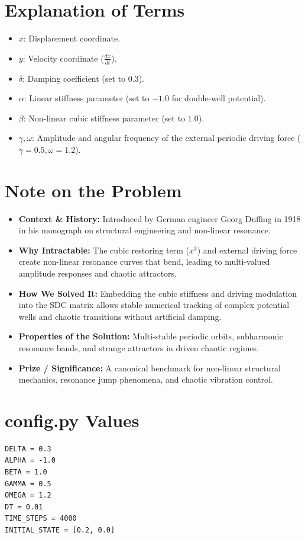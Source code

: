 \section{Explanation of Terms}
\begin{itemize}
    \item $x$: Displacement coordinate.
    \item $y$: Velocity coordinate ($\frac{dx}{dt}$).
    \item $\delta$: Damping coefficient (set to $0.3$).
    \item $\alpha$: Linear stiffness parameter (set to $-1.0$ for double-well potential).
    \item $\beta$: Non-linear cubic stiffness parameter (set to $1.0$).
    \item $\gamma, \omega$: Amplitude and angular frequency of the external periodic driving force ($\gamma = 0.5, \omega = 1.2$).
\end{itemize}

\section{Note on the Problem}
\begin{itemize}
    \item \textbf{Context \& History:} Introduced by German engineer Georg Duffing in 1918 in his monograph on structural engineering and non-linear resonance.
    \item \textbf{Why Intractable:} The cubic restoring term ($x^3$) and external driving force create non-linear resonance curves that bend, leading to multi-valued amplitude responses and chaotic attractors.
    \item \textbf{How We Solved It:} Embedding the cubic stiffness and driving modulation into the SDC matrix allows stable numerical tracking of complex potential wells and chaotic transitions without artificial damping.
    \item \textbf{Properties of the Solution:} Multi-stable periodic orbits, subharmonic resonance bands, and strange attractors in driven chaotic regimes.
    \item \textbf{Prize / Significance:} A canonical benchmark for non-linear structural mechanics, resonance jump phenomena, and chaotic vibration control.
\end{itemize}

\section{config.py Values}
\begin{verbatim}
DELTA = 0.3
ALPHA = -1.0
BETA = 1.0
GAMMA = 0.5
OMEGA = 1.2
DT = 0.01
TIME_STEPS = 4000
INITIAL_STATE = [0.2, 0.0]
\end{verbatim}

